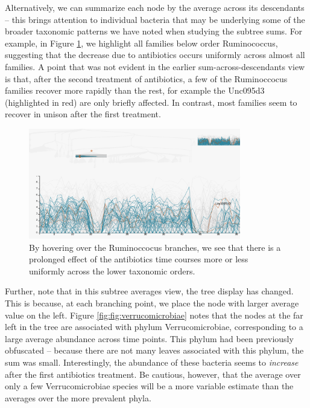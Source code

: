 \documentclass[12pt]{article}
\begin{document}
Alternatively, we can summarize each node by the average across its
descendants -- this brings attention to individual bacteria that may be
underlying some of the broader taxonomic patterns we have noted when
studying the subtree sums. For example, in Figure
\ref{fig:ruminococcus}, we highlight all families below order
Ruminococcus, suggesting that the decrease due to antibiotics occurs
uniformly across almost all families. A point that was not evident in
the earlier sum-across-descendants view is that, after the second
treatment of antibiotics, a few of the Ruminoccocus families recover
more rapidly than the rest, for example the Unc095d3 (highlighted in
red) are only briefly affected. In contrast, most families seem to
recover in unison after the first treatment.

\begin{figure}

{\centering \includegraphics[width=350px]{figure/ruminococcus}

}

\caption{By hovering over the Ruminoccocus branches, we see that there is a prolonged effect of the antibiotics time courses more or less uniformly across the lower taxonomic orders.}\label{fig:ruminococcus}
\end{figure}

Further, note that in this subtree averages view, the tree display has changed.
This is because, at each branching point, we place the node with larger average
value on the left. Figure \ref{fig:fig:verrucomicrobiae} notes that the nodes at
the far left in the tree are associated with phylum Verrucomicrobiae,
corresponding to a large average abundance across time points. This phylum had
been previously obfuscated -- because there are not many leaves associated with
this phylum, the sum was small. Interestingly, the abundance of these bacteria
seems to \emph{increase} after the first antibiotics treatment. Be cautious,
however, that the average over only a few Verrucomicrobiae species will be a
more variable estimate than the averages over the more prevalent phyla.
\end{document}
